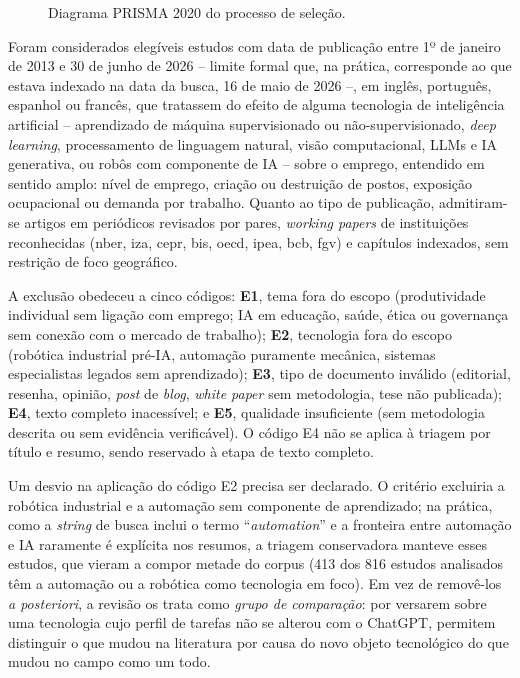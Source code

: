 \begin{figure}[h]
\centering
\caption{Diagrama PRISMA 2020 do processo de seleção.}
\label{fig:prisma}

\end{figure}


Foram considerados elegíveis estudos com data de publicação entre 1º de janeiro de 2013 e 30 de junho de 2026 -- limite formal que, na prática, corresponde ao que estava indexado na data da busca, 16 de maio de 2026 --, em inglês, português, espanhol ou francês, que tratassem do efeito de alguma tecnologia de inteligência artificial -- aprendizado de máquina supervisionado ou não-supervisionado, \textit{deep learning}, processamento de linguagem natural, visão computacional, LLMs e IA generativa, ou robôs com componente de IA -- sobre o emprego, entendido em sentido amplo: nível de emprego, criação ou destruição de postos, exposição ocupacional ou demanda por trabalho. Quanto ao tipo de publicação, admitiram-se artigos em periódicos revisados por pares, \textit{working papers} de instituições reconhecidas (\acrshort{nber}, \acrshort{iza}, \acrshort{cepr}, \acrshort{bis}, \acrshort{oecd}, \acrshort{ipea}, \acrshort{bcb}, \acrshort{fgv}) e capítulos indexados, sem restrição de foco geográfico.

A exclusão obedeceu a cinco códigos: \textbf{E1}, tema fora do escopo (produtividade individual sem ligação com emprego; IA em educação, saúde, ética ou governança sem conexão com o mercado de trabalho); \textbf{E2}, tecnologia fora do escopo (robótica industrial pré-IA, automação puramente mecânica, sistemas especialistas legados sem aprendizado); \textbf{E3}, tipo de documento inválido (editorial, resenha, opinião, \textit{post} de \textit{blog}, \textit{white paper} sem metodologia, tese não publicada); \textbf{E4}, texto completo inacessível; e \textbf{E5}, qualidade insuficiente (sem metodologia descrita ou sem evidência verificável). O código E4 não se aplica à triagem por título e resumo, sendo reservado à etapa de texto completo.

Um desvio na aplicação do código E2 precisa ser declarado. O critério excluiria a robótica industrial e a automação sem componente de aprendizado; na prática, como a \textit{string} de busca inclui o termo ``\textit{automation}'' e a fronteira entre automação e IA raramente é explícita nos resumos, a triagem conservadora manteve esses estudos, que vieram a compor metade do corpus (413 dos 816 estudos analisados têm a automação ou a robótica como tecnologia em foco). Em vez de removê-los \textit{a posteriori}, a revisão os trata como \emph{grupo de comparação}: por versarem sobre uma tecnologia cujo perfil de tarefas não se alterou com o ChatGPT, permitem distinguir o que mudou na literatura por causa do novo objeto tecnológico do que mudou no campo como um todo.


